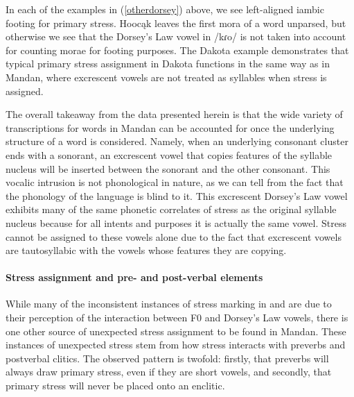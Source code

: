 In each of the examples in (\ref{otherdorsey}) above, we see left-aligned iambic footing for primary stress. Hoocąk leaves the first mora of a word unparsed, but otherwise we see that the Dorsey's Law vowel in /kɾo/ is not taken into account for counting morae for footing purposes. The Dakota example demonstrates that typical primary stress assignment in Dakota functions in the same way as in Mandan, where excrescent vowels are not treated as syllables when stress is assigned.

The overall takeaway from the data presented herein is that the wide variety of transcriptions for words in Mandan can be accounted for once the underlying structure of a word is considered. Namely, when an underlying consonant cluster ends with a sonorant, an excrescent vowel that copies features of the syllable nucleus will be inserted between the sonorant and the other consonant. This vocalic intrusion is not phonological in nature, as we can tell from the fact that the phonology of the language is blind to it. This excrescent Dorsey's Law vowel exhibits many of the same phonetic correlates of stress as the original syllable nucleus because for all intents and purposes it is actually the same vowel. Stress cannot be assigned to these vowels alone due to the fact that excrescent vowels are tautosyllabic with the vowels whose features they are copying.


\paragraph{Stress assignment and pre- and post-verbal elements}\label{ParaPreverbStress}

While many of the inconsistent instances of stress marking in \citet{kennard1936} and \citet{hollow1970} are due to their perception of the interaction between F0 and Dorsey's Law vowels, there is one other source of unexpected stress assignment to be found in Mandan. These instances of unexpected stress stem from how stress interacts with preverbs and postverbal clitics. The observed pattern is twofold: firstly, that preverbs will always draw primary stress, even if they are short vowels, and secondly, that primary stress will never be placed onto an enclitic.


